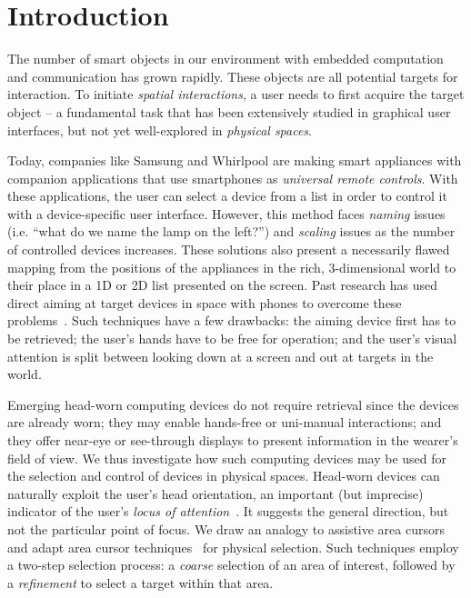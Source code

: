 \vfill
\section{Introduction}

The number of smart objects in our environment with embedded computation and communication has grown rapidly. These objects are all potential targets for interaction. To initiate {\em spatial interactions}, a user needs to first acquire the target object -- a fundamental task that has been extensively studied in graphical user interfaces, but not yet well-explored in {\em physical spaces}.

Today, companies like Samsung and Whirlpool are making smart appliances with companion applications that use smartphones as {\em universal remote controls}. With these applications, the user can select a device from a list in order to control it with a device-specific user interface. However, this method faces {\em naming} issues (i.e. ``what do we name the lamp on the left?'') and {\em scaling} issues as the number of controlled devices increases. These solutions also present a necessarily flawed mapping from the positions of the appliances in the rich, 3-dimensional world to their place in a 1D or 2D list presented on the screen.
%
Past research has used direct aiming at target devices in space with phones to overcome these problems~\cite{beigl_point_1999,patel_2-way_2003}. Such techniques have a few drawbacks: the aiming device first has to be retrieved; the user's hands have to be free for operation; and the user's visual attention is split between looking down at a screen and out at targets in the world. 

Emerging head-worn computing devices do not require retrieval since the devices are already worn; they may enable hands-free or uni-manual interactions; and they offer near-eye or see-through displays to present information in the wearer's field of view. We thus investigate how such computing devices may be used for the selection and control of devices in physical spaces. Head-worn devices can naturally exploit the user's head orientation, an important (but imprecise) indicator of the user's {\em locus of attention}~\cite{raskin}. It suggests the general direction, but not the particular point of focus. We draw an analogy to assistive area cursors and adapt area cursor techniques~\cite{kabbash1995prince,worden1997making,findlater2010enhanced} for physical selection. Such techniques employ a two-step selection process: a {\em coarse} selection of an area of interest, followed by a {\em refinement} to select a target within that area.

